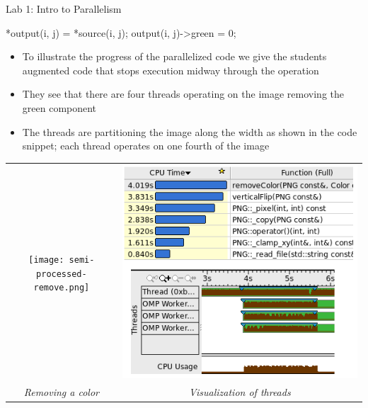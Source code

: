 \documentclass[final,t]{beamer}
\begin{document}
\begin{frame}[fragile]{}
\begin{columns}[t]
\begin{column}{.3\linewidth}
\begin{block}{Lab 1: Intro to Parallelism}
\begin{cppcode}
{{      *output(i, j) = *source(i, j);
       output(i, j)->green = 0;
   }
}
                \end{cppcode}
                \begin{itemize}
                \item To illustrate the progress of the parallelized code we
                    give the students augmented code that stops execution midway
                    through the operation
                \item They see that there are four threads operating on the
                    image removing the green component
                \item The threads are partitioning the image along the width as
                    shown in the code snippet; each thread operates on one fourth of the
                    image
                \end{itemize}
                \vspace*{1.0in}
                \begin{tabular}{cc}
                \texttt{[image: semi-processed-remove.png]}
                &
                \includegraphics[width=7.5in]{tool-small.png}
                \\
                \emph{Removing a color} &
                \emph{Visualization of threads} \\
                \end{tabular}
                \vspace*{1.0in}

\end{block}
\end{column}
\end{columns}
\end{frame}
\end{document}
